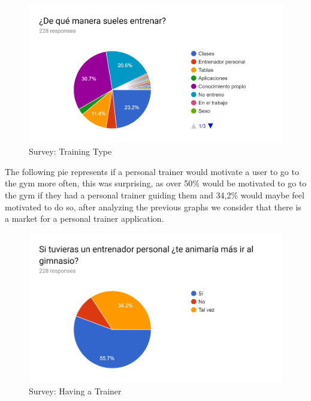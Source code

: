 \begin{center}
	\begin{figure}[h!]
		\centering
		\includegraphics[scale=1]{./images/4-train-type}
		\caption{Survey: Training Type}
		\label{4_train_type}
	\end{figure}
\end{center}

The following pie represents if a personal trainer would motivate a user to go to the gym more often, this was surprising, as over 50\% would be motivated to go to the gym if they had a personal trainer guiding them and 34,2\% would maybe feel motivated to do so, after analyzing the previous graphs we consider that there is a market for a personal trainer application.

\begin{center}
	\begin{figure}[h!]
		\centering
		\includegraphics[scale=1]{./images/4-if-trainer}
		\caption{Survey: Having a Trainer}
		\label{4_if_trainer}
	\end{figure}
\end{center}

